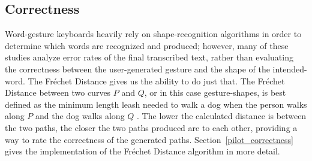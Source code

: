 \subsection{Correctness}
Word-gesture keyboards heavily rely on shape-recognition algorithms in order to determine which words are recognized and produced; however, many of these studies analyze error rates of the final transcribed text, rather than evaluating the correctness between the user-generated gesture and the shape of the intended-word. The Fr\'echet Distance gives us the ability to do just that. The Fr\'echet Distance between two curves $P$ and $Q$, or in this case gesture-shapes, is best defined as the minimum length leash needed to walk a dog when the person walks along $P$ and the dog walks along $Q$ \cite{ref_frechet}. The lower the calculated distance is between the two paths, the closer the two paths produced are to each other, providing a way to rate the correctness of the generated paths. Section~\ref{pilot_correctness} gives the implementation of the Fr\'echet Distance algorithm in more detail.